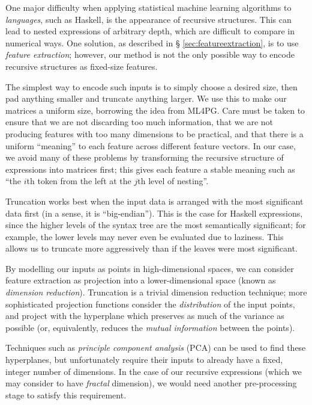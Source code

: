 One major difficulty when applying statistical machine learning algorithms to
\emph{languages}, such as Haskell, is the appearance of recursive
structures. This can lead to nested expressions of arbitrary depth, which are
difficult to compare in numerical ways. One solution, as described in \S
\ref{sec:featureextraction}, is to use \emph{feature extraction}; however, our
method is not the only possible way to encode recursive structures as fixed-size
features.

The simplest way to encode such inputs is to simply choose a desired size, then
pad anything smaller and truncate anything larger. We use this to make our
matrices a uniform size, borrowing the idea from ML4PG. Care must be taken to
ensure that we are not discarding too much information, that we are not
producing features with too many dimensions to be practical, and that there is a
uniform ``meaning'' to each feature across different feature vectors. In our
case, we avoid many of these problems by transforming the recursive structure of
expressions into matrices first; this gives each feature a stable meaning such
as ``the $i$th token from the left at the $j$th level of nesting''.

Truncation works best when the input data is arranged with the most significant
data first (in a sense, it is ``big-endian''). This is the case for Haskell
expressions, since the higher levels of the syntax tree are the most
semantically significant; for example, the lower levels may never even be
evaluated due to laziness. This allows us to truncate more aggressively than if
the leaves were most significant.

By modelling our inputs as points in high-dimensional spaces, we can consider
feature extraction as projection into a lower-dimensional space (known as
\emph{dimension reduction}). Truncation is a trivial dimension reduction
technique; more sophisticated projection functions consider the
\emph{distribution} of the input points, and project with the hyperplane which
preserves as much of the variance as possible (or, equivalently, reduces the
\emph{mutual information} between the points).

Techniques such as \emph{principle component analysis} (PCA) can be used to find
these hyperplanes, but unfortunately require their inputs to already have a
fixed, integer number of dimensions. In the case of our recursive expressions
(which we may consider to have \emph{fractal} dimension), we would need another
pre-processing stage to satisfy this requirement.

